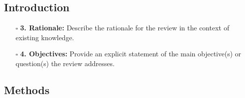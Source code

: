 \documentclass[11pt]{article}
\def\tightlist{}
\begin{document}
\begin{Form}
\subsection{Introduction}\label{introduction}

\begin{itemize}
\tightlist
\item[$\square$]
  \textbf{3. Rationale:} Describe the rationale for the review in the
  context of existing knowledge.
\item[$\square$]
  \textbf{4. Objectives:} Provide an explicit statement of the main
  objective(s) or question(s) the review addresses.
\end{itemize}

\subsection{Methods}\label{methods}


\end{Form}
\end{document}
